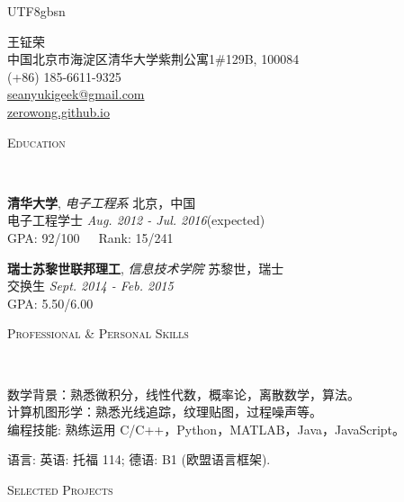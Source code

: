 \documentclass[a4paper]{article}
\newenvironment{changemargin}[2]{%
  \begin{list}{}{%
    \setlength{\topsep}{0pt}%
    \setlength{\leftmargin}{#1}%
    \setlength{\rightmargin}{#2}%
    \setlength{\listparindent}{\parindent}%
    \setlength{\itemindent}{\parindent}%
    \setlength{\parsep}{\parskip}%
  }%
  \item[]}{\end{list}
}
\newcommand{\lineover}{
	\begin{changemargin}{-0.05in}{-0.05in}
		\vspace*{-8pt}
		\hrulefill \\
		\vspace*{-2pt}
	\end{changemargin}
}
\newcommand{\header}[1]{
	\begin{changemargin}{-0.5in}{-0.5in}
		\scshape{#1}\\
  	\lineover
	\end{changemargin}
}
\newcommand{\contact}[5]{
	\begin{changemargin}{-0.5in}{-0.5in}
		\begin{center}
			{\Large \scshape {#1}}\\ \smallskip
			{#2}\\ \smallskip 
			{#3}\\ \smallskip
			{\href{mailto:#4}{#4}}\\ \smallskip
			{\href{#5}{#5}}\smallskip
		\end{center}
	\end{changemargin}
}
\newenvironment{body} {
	\vspace*{-16pt}
	\begin{changemargin}{-0.25in}{-0.5in}
  }	
	{\end{changemargin}
}
\begin{document}
\begin{CJK*}{UTF8}{gbsn}
\contact{王钲荣}{中国北京市海淀区清华大学紫荆公寓1\#129B, 100084}{(+86) 185-6611-9325}{seanyukigeek@gmail.com}{zerowong.github.io}


\header{Education}

\begin{body}
	\vspace{14pt}

	\textbf{清华大学}, \emph{电子工程系} \hfill 北京，中国 \\
电子工程学士 \hfill \emph{Aug. 2012 - Jul. 2016}(expected){} \\
GPA: 92/100\ \ \ Rank: 15/241\\
\vspace{6pt}

	\textbf{瑞士苏黎世联邦理工}, \emph{信息技术学院} \hfill 苏黎世，瑞士 \\
	交换生 \hfill \emph{Sept. 2014 - Feb. 2015}{} \\
GPA: 5.50/6.00\\


\end{body}

\smallskip
\smallskip

\header{Professional \& Personal Skills}

\begin{body}
	\vspace{14pt}
	数学背景：熟悉微积分，线性代数，概率论，离散数学，算法。\\
	\smallskip
	计算机图形学：熟悉光线追踪，纹理贴图，过程噪声等。 \\
	\smallskip
	编程技能: 熟练运用 C/C++，Python，MATLAB，Java，JavaScript。\\
	\smallskip

	语言: 英语: 托福 114; 德语: B1 (欧盟语言框架).\\
\end{body}
\smallskip
\smallskip

\header{Selected Projects}


\end{CJK*}
\end{document}
